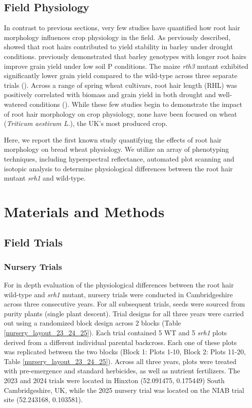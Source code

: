 \documentclass{article}
\begin{document}
\subsection{Field Physiology}
In contrast to previous sections, very few studies have quantified how root hair morphology influences crop physiology in the field. As perviously described, \cite{marin_significance_2021} showed that root hairs contributed to yield stability in barley under drought conditions. \cite{gahoonia_barley_2004} previously demonstrated that barley genotypes with longer root hairs improve grain yield under low soil P conditions. The maize \textit{rth3} mutant exhibited significantly lower grain yield compared to the wild-type across three separate trials (\cite{hochholdinger_maize_2008}). Across a range of spring wheat cultivars, root hair length (RHL) was positively correlated with biomass and grain yield in both drought and well-watered conditions (\cite{maqbool_association_2022}). While these few studies begin to demonstrate the impact of root hair morphology on crop physiology, none have been focused on wheat (\textit{Triticum aestivum L.}), the UK's most produced crop.

Here, we report the first known study quantifying the effects of root hair morphology on bread wheat physiology. We utilize an array of phenotyping techniques, including hyperspectral reflectance, automated plot scanning and isotopic analysis to determine physiological differences between the root hair mutant \textit{srh1} and wild-type.


\section{Materials and Methods}

\subsection{Field Trials}

\subsubsection{Nursery Trials}
For in depth evaluation of the physiological differences between the root hair wild-type and \textit{srh1} mutant, nursery trials were conducted in Cambridgeshire across three consecutive years. For all subsequent trials, seeds were sourced from purity plants (single plant descent). Trial designs for all three years were carried out using a randomized block design across 2 blocks (Table \ref{nursery_layout_23_24_25}). Each trial contained 5 WT and 5 \textit{srh1} plots derived from a different individual parental backcross. Each one of these plots was replicated between the two blocks (Block 1: Plots 1-10, Block 2: Plots 11-20, Table \ref{nursery_layout_23_24_25}). Across all three years, plots were treated with pre-emergence and standard herbicides, as well as nutrient fertilizers. The 2023 and 2024 trials were located in Hinxton (52.091475, 0.175449) South Cambridgeshire, UK, while the 2025 nursery trial was located on the NIAB trial site (52.243168, 0.103581).
\end{document}
